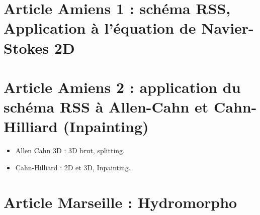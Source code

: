 
\section{Article Amiens 1 : schéma RSS, Application à l'équation de Navier-Stokes 2D}

\section{Article Amiens 2 : application du schéma RSS à Allen-Cahn et Cahn-Hilliard (Inpainting)}

\begin{itemize}
\item Allen Cahn 3D : 3D brut, splitting.
\item Cahn-Hilliard : 2D et 3D, Inpainting.
\end{itemize}

\section{Article Marseille : Hydromorpho}